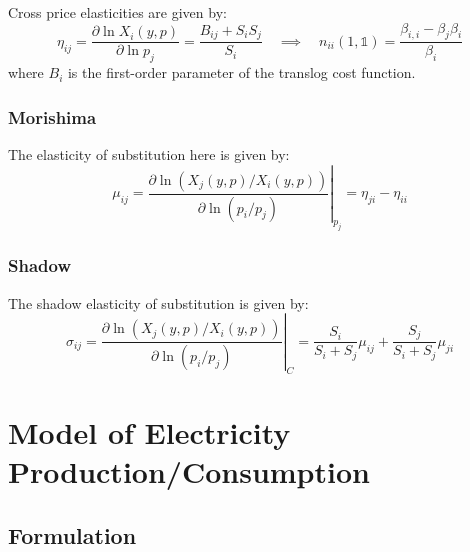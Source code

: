 \documentclass[12pt,a4paper]{extarticle}
\begin{document}
Cross price elasticities are given by:
$$\eta_{ij} = \frac{\partial \ln X_i(y, p)}{\partial \ln p_j} = \frac{B_{ij} + S_iS_j }{S_i}
\quad \implies \quad n_{ii}(1, \mathbb{1}) = \frac{\beta_{i,i} - \beta_{j}\beta_{i}}{\beta_i}$$
where $B_i$ is the first-order parameter of the translog cost function. 

\subsubsection{Morishima}

The elasticity of substitution here is given by:
$$\mu_{ij} = \left. \frac{\partial \ln(X_j(y, p) / X_i(y,p))}{\partial \ln(p_i/p_j)} \right|_{p_j} = \eta_{ji} - \eta_{ii}$$

\subsubsection{Shadow}

The shadow elasticity of substitution is given by:
$$\sigma_{ij} = \left. \frac{\partial \ln(X_j(y, p) / X_i(y,p))}{\partial \ln(p_i/p_j)} \right|_{C} = \frac{S_i}{S_i + S_j} \mu_{ij} + \frac{S_j}{S_i + S_j} \mu_{ji}$$


\pagebreak

\section{Model of Electricity Production/Consumption}

\subsection{Formulation}
\end{document}

